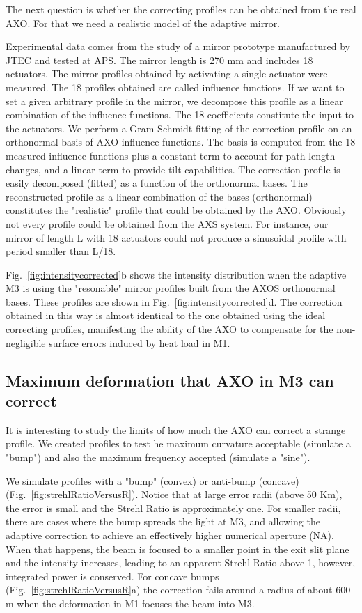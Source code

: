 \documentclass[]{spie}  %
\begin{document}
The next question is whether the correcting profiles can be obtained from the real AXO. For that we need a realistic model of the adaptive mirror.

Experimental data comes from the study of a mirror prototype manufactured by JTEC and tested at APS. The mirror length is 270 mm and includes 18 actuators. The mirror profiles obtained by activating a single actuator were measured. The 18 profiles obtained are called influence functions. If we want to set a given arbitrary  profile in the mirror, we decompose this profile as a linear combination of the influence functions. The 18 coefficients constitute the input to the actuators.  
We perform a Gram-Schmidt fitting of the correction profile on an orthonormal basis of AXO influence functions. The basis is computed from the 18 measured influence functions plus a constant term to account for path length changes, and a linear term to provide tilt capabilities. The correction profile is easily decomposed (fitted) as a function of the orthonormal bases. The reconstructed profile as a linear combination of the bases (orthonormal) constitutes the "realistic" profile that could be obtained by the AXO. Obviously not every profile could be obtained from the AXS system. For instance, our mirror of length L with 18 actuators could not produce a sinusoidal profile with period smaller than L/18. 

Fig.~\ref{fig:intensitycorrected}b shows the intensity distribution when the adaptive M3 is using the "resonable" mirror profiles built from the AXOS orthonormal bases. These profiles are shown in Fig.~\ref{fig:intensitycorrected}d. The correction obtained in this way is almost identical to the one obtained using the ideal correcting profiles, manifesting the ability of the AXO to compensate for the non-negligible surface errors induced by heat load in M1.  


\subsection{Maximum deformation that AXO in M3 can correct}

It is interesting to study the limits of how much the AXO can correct a strange profile. We created profiles to test he maximum curvature acceptable (simulate a "bump") and also the maximum frequency accepted (simulate a "sine"). 

We simulate profiles with a "bump" (convex) or anti-bump (concave) (Fig.~\ref{fig:strehlRatioVersusR}). Notice that at large error radii (above 50 Km), the error is small and the Strehl Ratio is approximately one. For smaller radii, there are cases where the bump spreads the light at M3, and allowing the adaptive correction to achieve an effectively higher numerical aperture (NA). When that happens, the beam is focused to a smaller point in the exit slit plane and the intensity increases, leading to an apparent Strehl Ratio above 1, however, integrated power is conserved.
For concave bumps (Fig.~\ref{fig:strehlRatioVersusR}a) the correction fails around a radius of about 600 m when the deformation in M1 focuses the beam into M3.
\end{document}
